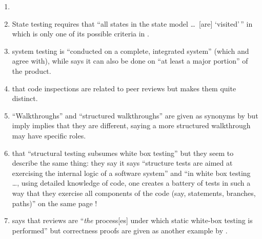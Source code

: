 \begin{enumerate}
    \item %
          \loadDiscrep{}
    \item %
          State testing requires that ``all states in the state model
          \dots\ [are] `visited'\,'' in \citep[p.~19]{IEEE2021} which
          is only one of its possible criteria in \citep[pp.~82-83]{Patton2006}.
    \item %
           \citet[p.~456]{IEEE2017}  system
          testing is ``conducted on a complete, integrated system'' (which
          \citet[Tab.~12.3]{PetersAndPedrycz2000} and
          \citet[p.~439]{vanVliet2000} agree with), while
          \citet[p.~109]{Patton2006} says it can also be done on ``at least a
          major portion'' of the product.
    \item %
           \citetISTQB{}  that code inspections
          are related to peer reviews but \citet[pp.~94-95]{Patton2006} makes
          them quite distinct.
    \item %
           \label{walkthrough-syns}
          ``Walkthroughs'' and ``structured walkthroughs'' are given
          as synonyms by \citetISTQB{} but \citet[p.~484]{PetersAndPedrycz2000}
          \ifnotpaper imply \else implies \fi that they are different, saying a
          more structured walkthrough may have specific roles.
    \item %
           \citeauthor{PetersAndPedrycz2000} 
          that ``structural testing
          subsumes white box testing'' but they seem to describe the same thing:
          \ifnotpaper they say \else it says \fi ``structure tests are aimed at
          exercising the internal logic of a software system'' and ``in white box
          testing \dots, using detailed knowledge of code, one creates a battery of
          tests in such a way that they exercise all components of the code
          (say, statements, branches, paths)'' on the same page
          \citeyearpar[p.~447]{PetersAndPedrycz2000}!
    \item %
           \citet[p.~92\ifnotpaper, emphasis added\fi]{Patton2006}
          says that reviews are ``\emph{the} process[es] under which static
          white-box testing is performed'' but correctness proofs are given
          as another example by \citet[pp.~418-419]{vanVliet2000}.


\end{enumerate}
